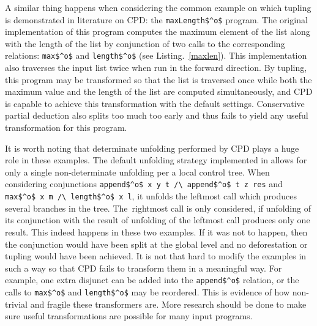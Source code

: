 A similar thing happens when considering the common example on which tupling is demonstrated in literature on CPD: the \lstinline{maxLength$^o$} program.
The original implementation of this program computes the maximum element of the list along with the length of the list by conjunction of two calls to the corresponding relations: \lstinline{max$^o$} and \lstinline{length$^o$} (see Listing.~\ref{maxlen}).
This implementation also traverses the input list twice when run in the forward direction.
By tupling, this program may be transformed so that the list is traversed once while both the maximum value and the length of the list are computed simultaneously, and CPD is capable to achieve this transformation with the default settings.
Conservative partial deduction also splits too much too early and thus fails to yield any useful transformation for this program.

It is worth noting that determinate unfolding performed by CPD plays a huge role in these examples.
The default unfolding strategy implemented in \ecce allows for only a single non-determinate unfolding per a local control tree.
When considering conjunctions \lstinline{append$^o$ x y t /\ append$^o$ t z res} and \lstinline{max$^o$ x m /\ length$^o$ x l}, it unfolds the leftmost call which produces several branches in the tree.
The~rightmost call is only considered, if unfolding of its conjunction with the result of unfolding of the leftmost call produces only one result.
This indeed happens in these two examples.
If it was not to happen, then the conjunction would have been split at the global level and no deforestation or tupling would have been achieved.
It is not that hard to modify the examples in such a way so that CPD fails to transform them in a meaningful way.
For example, one extra disjunct can be added into the \lstinline{append$^o$} relation, or the calls to \lstinline{max$^o$} and \lstinline{length$^o$} may be reordered.
This is evidence of how non-trivial and fragile these transformers are.
More research should be done to make sure useful transformations are possible for many input programs.



